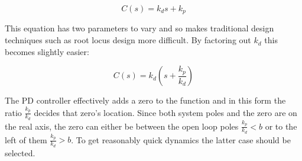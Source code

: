 \documentclass{article}
\begin{document}
	\begin{equation}
		\label{PDController}
		C(s) = k_d s + k_p
	\end{equation}
	
	This equation has two parameters to vary and so makes traditional design techniques such as root locus design more difficult. By factoring out $k_d$ this becomes slightly easier:
	
	\begin{equation}
		\label{PDModified}
		C(s) = k_d (s + \frac{k_p}{k_d})
	\end{equation}
	
	The PD controller effectively adds a zero to the function and in this form the ratio $\frac{k_p}{k_d}$ decides that zero's location. Since both system poles and the zero are on the real axis, the zero can either be between the open loop poles $\frac{k_p}{k_d} < b$ or to the left of them $\frac{k_p}{k_d} > b$. To get reasonably quick dynamics the latter case should be selected.
\end{document}
